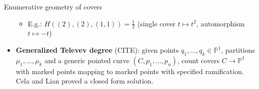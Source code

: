 \documentclass{beamer}
\renewcommand{\P}{\mathbb P}
\theoremstyle{definition}
\begin{document}
\begin{frame}{Enumerative geometry of covers}
\begin{itemize}
\begin{itemize}
                                                \item E.g.: $H((2),(2),(1,1))=\frac 12$ (single cover $t\mapsto t^2$, automorphism $t\mapsto -t$)                                                                                                                                                                                \end{itemize}
                                                                                                                                                                                                                            \item {\bf Generalized Televev degree} (CITE): given points $q_1,\dots,q_k\in\P^1$,
                                                                                                                                                                                                                              partitions $\mu_1,\dots,\mu_k$ and a generic pointed curve
                                                                                                                                                                                                                              $(C,p_1,\dots,p_n)$, count covers $C\to\P^1$ with marked points mapping to marked points
                                                                                                                                                                                                                              with specified ramification. Cela and Lian proved a closed form solution.
                                                                                                                                                                                                                            \end{itemize}
                                                                                                                                                                                                                          \end{frame}
\end{document}
